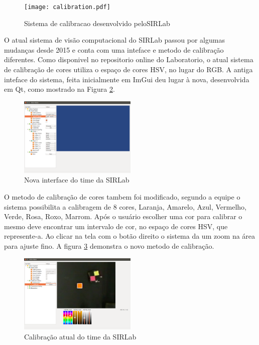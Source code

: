 \begin{figure}[!h]
	\centering
	\texttt{[image: calibration.pdf]} 	
	\caption{Sistema de calibracao desenvolvido peloSIRLab \cite{VSSVision}}
	\label{SIRLabCalibracaoHSV}
\end{figure}

O atual sistema de visão computacional do SIRLab passou por algumas mudanças desde 2015 e conta com uma inteface e metodo de calibração diferentes\cite{VSSVision}. 
Como disponivel no repositorio online do Laboratorio, o atual sistema de calibração de cores utiliza o espaço de cores HSV, no lugar do RGB\cite{Rosa:2015}. A antiga inteface do sistema, feita inicialmente em ImGui deu lugar à nova, desenvolvida em Qt, como mostrado na Figura \ref{SIRLabNova}.
\begin{figure}[!h]
	\centering
	\includegraphics[width=0.5\textwidth]{vsssnovonormal.png} 	
	\caption{Nova interface do time da SIRLab \cite{VSSVision}}
	\label{SIRLabNova}
\end{figure}

O metodo de calibração de cores tambem foi modificado, segundo a equipe\cite{VSSVision} o sistema possibilita a calibragem de 8 cores, Laranja, Amarelo, Azul, Vermelho, Verde, Rosa, Roxo, Marrom. Após o usuário escolher uma cor para calibrar o mesmo deve encontrar um intervalo de cor, no espaço de cores HSV, que represente-a. Ao clicar na tela com o botão direito o sistema da um zoom na área para ajuste fino. A figura \ref{SIRLabNovaCalibracao} demonstra o novo metodo de calibração.

\begin{figure}[!h]
	\centering
	\includegraphics[width=0.5\textwidth]{vsssnovo.png} 	
	\caption{Calibração atual do time da SIRLab \cite{VSSVision}}
	\label{SIRLabNovaCalibracao}
\end{figure}